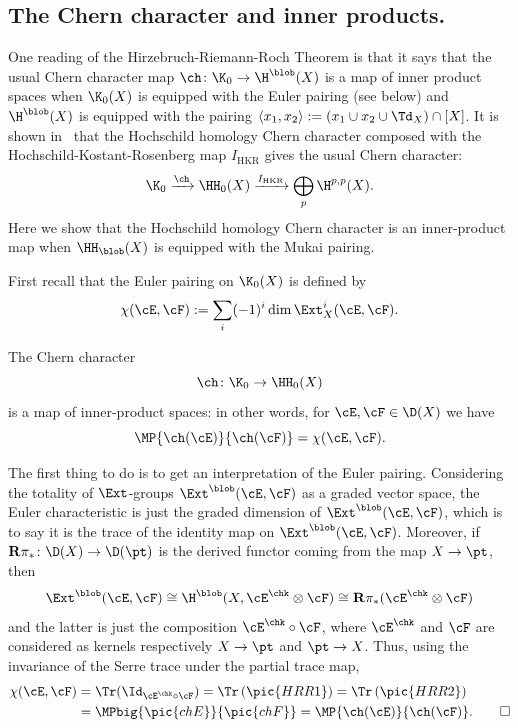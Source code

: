  \subsection{The Chern character and inner products.}
One reading of the Hirzebruch-Riemann-Roch Theorem is that it says
that the usual Chern character map $\ch\colon \K_0\to \H^\blob(X)$ is
a map of inner product spaces when $\K_0(X)$ is equipped with the
Euler pairing (see below) and $\H^\blob(X)$ is equipped with the
pairing $\langle x_1,x_2\rangle:=(x_1\cup x_2 \cup \Td_X)\cap [X]$.
It is shown in~\cite{CalHH2} that the Hochschild homology Chern
character composed with the Hochschild-Kostant-Rosenberg map
$I_{\text{HKR}}$ gives the usual Chern character:
\[\K_0\xrightarrow{\ch}\HH_0(X)\xrightarrow{I_\text{HKR}}
\bigoplus_p \H^{p,p}(X).\]
Here we show that the Hochschild homology Chern character is an
inner-product map when $\HH_\blob(X)$ is equipped with the Mukai
pairing.

First recall that the Euler pairing on $\K_0(X)$ is defined by
\[\chi(\cE,\cF):=\sum_i (-1)^i \dim \Ext^i_X(\cE, \cF). \]

\begin{Theorem}
\label{thm:hrr}
The Chern character
\[ \ch\colon \K_0\to \HH_0(X) \]
is a map of inner-product spaces: in other words, for $\cE, \cF\in
\D(X)$ we have
\[ \MP{\ch(\cE)}{\ch(\cF)} = \chi(\cE, \cF). \]
\end{Theorem}

\begin{Proof}
  The first thing to do is to get an interpretation of the Euler
  pairing.  Considering the totality of $\Ext$-groups
  $\Ext^\blob(\cE,\cF)$ as a graded vector space, the Euler
  characteristic is just the graded dimension of
  $\Ext^\blob(\cE,\cF)$, which is to say it is the trace of the
  identity map on $\Ext^\blob(\cE,\cF)$.  Moreover, if ${\mathbf R}\pi_*\colon
  \D(X)\to \D(\pt)$ is the derived functor coming from the map $X\to
  \pt$, then
  $$\Ext^\blob(\cE,\cF)\cong
  \H^\blob(X,\cE^\chk\otimes\cF)\cong {\mathbf R}\pi_*(\cE^\chk\otimes\cF)$$ and
  the latter is just the composition $\cE^\chk\circ \cF$, where
  $\cE^\chk$ and $\cF$ are considered as kernels respectively $X\to
  \pt$ and $\pt\to X$.  Thus, using the invariance of the Serre trace
  under the partial trace map,
  \begin{align*}
    \chi(\cE,\cF)&=\Tr(\Id_{\cE^\chk\circ \cF})
    =\Tr\left(\pic{HRR1}\right)
    =\Tr\left(\pic{HRR2}\right)\\&=\MPbig{\pic{chE}}{\pic{chF}}
    =\MP{\ch(\cE)}{\ch(\cF)}.\qedhere
  \end{align*}
\end{Proof}

